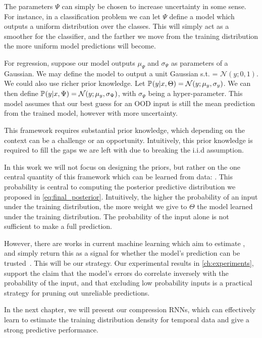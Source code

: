 \documentclass[../main.tex]{subfiles}
\begin{document}
The parameters $\Psi$ can simply be chosen to increase uncertainty in some sense. For instance, in a classification problem we can let $\Psi$ define a model which outputs a uniform distribution over the classes. This will simply act as a smoother for the classifier, and the farther we move from the training distribution the more uniform model predictions will become. 

For regression, suppose our model outputs $\mu_\Psi$ and $\sigma_\Psi$ as parameters of a Gaussian. We may define the model to output a unit Gaussian s.t.  = $\mathcal{N}(y; 0, 1)$. We could also use richer prior knowledge. Let $\mathbb{P}_{}(y|x, \Theta) = \mathcal{N}(y; \mu_y, \sigma_y)$. We can then define $\mathbb{P}_{}(y|x, \Psi) = \mathcal{N}(y; \mu_y, \sigma_\Psi)$, with $\sigma_\Psi$ being a hyper-parameter. This model assumes that our best guess for an OOD input is still the mean prediction from the trained model, however with more uncertainty. 

This framework requires substantial prior knowledge, which depending on the context can be a challenge or an opportunity. Intuitively, this prior knowledge is required to fill the gaps we are left with due to breaking the i.i.d assumption. 

In this work we will not focus on designing the priors, but rather on the one central quantity of this framework which can be learned from data: . This probability is central to computing the posterior predictive distribution we proposed in \cref{eq:final_posterior}. Intuitively, the higher the probability of an input under the training distribution, the more weight we give to $\Theta$ the model learned under the training distribution. The probability of the input alone is not sufficient to make a full prediction.

However, there are works in current machine learning which aim to estimate , and simply return this as a signal for whether the model's prediction can be trusted~\citep{vasilev2018q, pidhorskyi2018generative}. This will be our strategy. Our experimental results in \cref{ch:experiments}, support the claim that the model's errors do correlate inversely with the probability of the input, and that excluding low probability inputs is a practical strategy for pruning out unreliable predictions. 

In the next chapter, we will present our compression RNNs, which can effectively learn to estimate the training distribution density for temporal data and give a strong predictive performance.  
\end{document}
